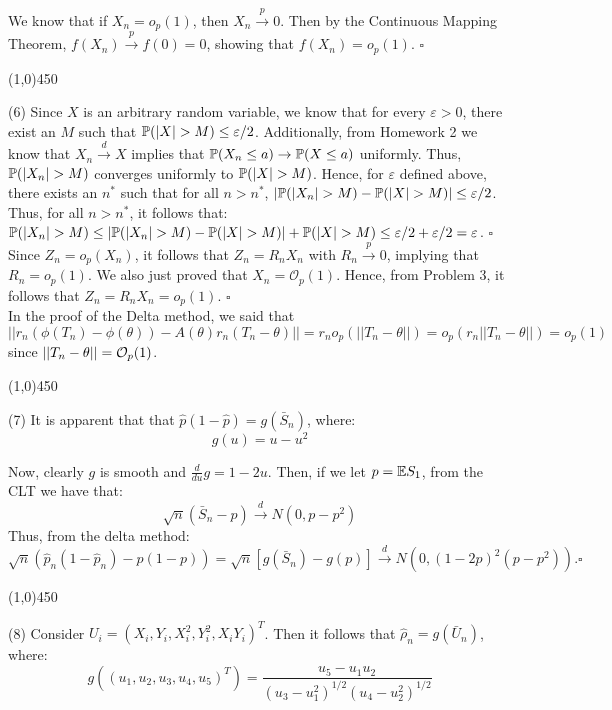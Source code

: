 \documentclass[12pt]{article}
\begin{document}
\noindent
We know that if $X_n = o_p(1)$, then $X_n \overset{p}\to 0$. Then by the Continuous Mapping Theorem, $f(X_n) \overset{p}\to f(0) = 0$, showing that $f(X_n) = o_p(1)$. $\square$
\begin{center}
\line(1,0){450}
\end{center}

\noindent
(6) Since $X$ is an arbitrary random variable, we know that for every $\varepsilon > 0$, there exist an $M$ such that $\prob(|X|>M) \leq \varepsilon/2$. Additionally, from Homework 2 we know that $X_n \overset{d}\to X$ implies that $\mathbb{P}(X_n \leq a) \to \mathbb{P}(X \leq a)$ uniformly. Thus, $\prob(|X_n|>M)$ converges uniformly to $\prob(|X|>M)$. Hence, for $\varepsilon$ defined above, there exists an $n^*$ such that for all $n>n^*$, $|\prob(|X_n|>M)-\prob(|X|>M)| \leq \varepsilon/2$. Thus, for all $n>n^*$, it follows that:\\
\indent $\prob(|X_n|>M) \leq |\prob(|X_n|>M)-\prob(|X|>M)|+\prob(|X|>M) \leq \varepsilon/2 + \varepsilon/2 = \varepsilon$.
$\square$\\

\noindent
Since $Z_n = o_p(X_n)$, it follows that $Z_n = R_n X_n$ with $R_n \overset{p}\to 0$, implying that $R_n = o_p(1)$. We also just proved that $X_n = \mathcal{O}_p(1)$. Hence, from Problem 3, it follows that $Z_n = R_n X_n = o_p(1)$. $\square$\\

\noindent
In the proof of the Delta method, we said that $||r_n(\phi(T_n)-\phi(\theta))-A(\theta)r_n(T_n-\theta)|| = r_no_p(||T_n-\theta||) = o_p(r_n||T_n-\theta||) = o_p(1)$ since $||T_n-\theta|| = \mathcal{O}_p(1)$.
\begin{center}
\line(1,0){450}
\end{center}

\noindent
(7) It is apparent that that $\hat{p}(1-\hat{p}) = g(\bar{S}_n)$, where:
$$ g(u) = u-u^2 $$

\noindent
Now, clearly $g$ is smooth and $\frac{d}{du}g = 1-2u$. Then, if we let $p = \mathbb{E} S_1$, from the CLT we have that:
$$\sqrt{n}(\bar{S}_n-p) \overset{d}\to N(0,p-p^2)$$
Thus, from the delta method: 
$$\sqrt{n}(\hat{p}_n(1-\hat{p}_n)-p(1-p)) = \sqrt{n} [g(\bar{S}_n)-g(p)] \overset{d}\to N(0,(1-2p)^2(p-p^2)). \square$$
\begin{center}
\line(1,0){450}
\end{center}

\pagebreak
\noindent
(8) Consider $U_i = (X_i,Y_i,X_i^2,Y_i^2,X_iY_i)^T$. Then it follows that $\hat{\rho}_n = g(\bar{U}_n)$, where:
$$g((u_1,u_2,u_3,u_4,u_5)^T) = \frac{u_5-u_1u_2}{(u_3-u_1^2)^{1/2}(u_4-u_2^2)^{1/2}}$$
\end{document}
